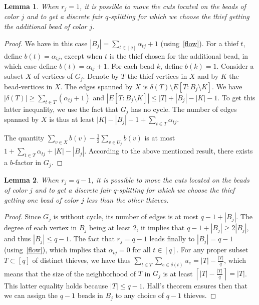 \documentclass[12pt]{amsart}
\newtheorem{lemma}{Lemma}
\theoremstyle{remark}
\begin{document}
\begin{lemma}\label{lem:r1}
When $r_j=1$, it is possible to move the cuts located on the beads of color $j$ and to get a discrete fair $q$-splitting for which we choose the thief getting the additional bead of color $j$. 
\end{lemma}

\begin{proof}
We have in this case $|B_j|=\sum_{t\in [q]}\alpha_{tj}+1$ (using~\eqref{flow}). For a thief $t$, define $b(t)=\alpha_{tj}$, except when $t$ is the thief chosen for the additional bead, in which case define $b(t)=\alpha_{tj}+1$. For each bead $k$, define $b(k)=1$. Consider a subset $X$ of vertices of $G_j$. Denote by $T$ the thief-vertices in $X$ and by $K$ the bead-vertices in $X$. The edges spanned by $X$ is $\delta(T)\setminus E[T:B_j\setminus K]$. We have $|\delta(T)|\geq\sum_{t\in T}(\alpha_{tj}+1)$ and $|E[T:B_j\setminus K]|\leq |T|+|B_j|-|K|-1$. To get this latter inequality, we use the fact that $G_j$ has no cycle. The number of edges spanned by $X$ is thus at least $|K|-|B_j|+1+\sum_{t\in T}\alpha_{tj}$. 

The quantity $\sum_{v\in X}b(v)-\frac 1 2 \sum_{v\in U_j}b(v)$ is at most $1+\sum_{t\in T}\alpha_{tj}+|K|-|B_j|$. According to the above mentioned result, there exists a $b$-factor in $G_j$.
\end{proof}

\begin{lemma}\label{lem:rq-1}
When $r_j=q-1$, it is possible to move the cuts located on the beads of color $j$ and to get a discrete fair $q$-splitting for which we choose the thief getting one bead of color $j$ less than the other thieves. 
\end{lemma}

\begin{proof}
Since $G_j$ is without cycle, its number of edges is at most $q-1+|B_j|$. The degree of each vertex in $B_j$ being at least $2$, it implies that $q-1+|B_j|\geq 2|B_j|$, and thus $|B_j|\leq q-1$. The fact that $r_j=q-1$ leads finally to $|B_j|=q-1$ (using~\eqref{flow}), which implies that $\alpha_{tj}=0$ for all $t\in[q]$. For any proper subset $T\subset [q]$ of distinct thieves, we have thus $\sum_{t\in T}\sum_{e\in\delta(t)}u_{e}=|T|-\frac {|T|}{q}$, which means that the size of the neighborhood of $T$ in $G_j$ is at least $\left\lceil|T|-\frac {|T|}{q}\right\rceil=|T|$. This latter equality holds because $|T|\leq q-1$. Hall's theorem ensures then that we can assign the $q-1$ beads in $B_j$ to any choice of $q-1$ thieves.
\end{proof}
\end{document}
